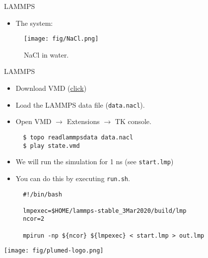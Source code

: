 \documentclass[10pt]{beamer}
\begin{document}
\begin{frame}{LAMMPS}
  \begin{itemize}
    \setlength\itemsep{1em}
    \item The system:
  \end{itemize}
  \begin{figure}
    \texttt{[image: fig/NaCl.png]}
    \caption{NaCl in water.}
  \end{figure}
\end{frame}

\begin{frame}[fragile]{LAMMPS}
  \begin{itemize}
    \setlength\itemsep{1em}
    \item Download VMD (\href{https://www.ks.uiuc.edu/Development/Download/download.cgi?PackageName=VMD}{click})

    \item Load the LAMMPS data file (\texttt{data.nacl}).

    \item Open VMD $\rightarrow$ Extensions $\rightarrow$ TK console.
    \begin{lstlisting}
  $ topo readlammpsdata data.nacl
  $ play state.vmd
    \end{lstlisting}

    \item We will run the simulation for 1 ns (see \texttt{start.lmp})

    \item You can do this by executing \texttt{run.sh}.
    \begin{lstlisting}
  #!/bin/bash

  lmpexec=$HOME/lammps-stable_3Mar2020/build/lmp
  ncor=2

  mpirun -np ${ncor} ${lmpexec} < start.lmp > out.lmp
    \end{lstlisting}
  \end{itemize}
\end{frame}

\begin{frame}{}
  \begin{center}
    \vspace{1.2cm}
    \texttt{[image: fig/plumed-logo.png]}
  \end{center}
\end{frame}
\end{document}
